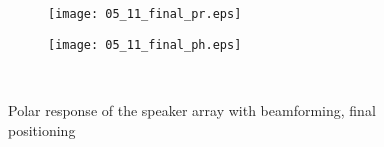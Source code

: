 \begin{figure}[h]
\begin{subfigure}[c]{0.5\textwidth}
\texttt{[image: 05\_11\_final\_pr.eps]}
\label{fig:05_11_final_pr}
\end{subfigure}
\begin{subfigure}[c]{0.5\textwidth}
\texttt{[image: 05\_11\_final\_ph.eps]}
\label{fig:05_11_final_ph}
\end{subfigure}\\
\caption{Polar response of the speaker array with beamforming, final positioning}  
\label{fig:05_11_final}
\end{figure}